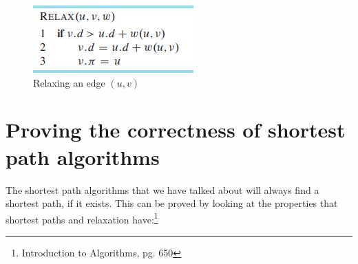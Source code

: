 \documentclass[11pt]{article}
\begin{document}
\begin{figure}[H]
\centering
\includegraphics[scale=0.4]{relaxation.png}
\caption{Relaxing an edge $(u,v)$}
\end{figure}


\section{Proving the correctness of shortest path algorithms}
The shortest path algorithms that we have talked about will always find a shortest path, if it exists. This can be proved by looking at the properties that shortest paths and relaxation have:\footnote{Introduction to Algorithms, pg. 650}
\end{document}
